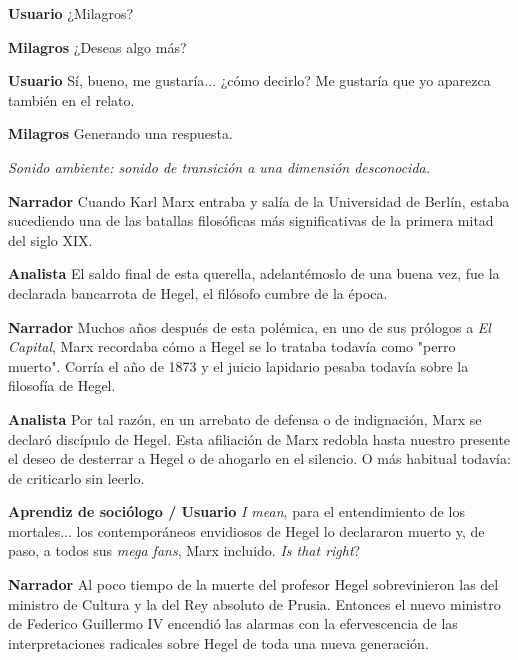 \documentclass[
  spanish,
  11pt,
  a4paper,
]{scrbook}
\newenvironment{transcripcion}{
    \begin{list}{}{
        \setlength{\leftmargin}{1.5em}  %
        \setlength{\rightmargin}{0em}
        \setlength{\itemsep}{0.2em}     %
        \setlength{\parsep}{0.0em}
        \setlength{\listparindent}{0pt}
    }
}{
    \end{list}
}
\newcommand{\personaje}[1]{\textbf{#1}\quad}
\newcommand{\escena}[1]{\textit{\small #1}\par\vspace{0.4em}}
\begin{document}
\begin{transcripcion}
\item \personaje{Usuario} ¿Milagros?

\item \personaje{Milagros} ¿Deseas algo más?

\item \personaje{Usuario} Sí, bueno, me gustaría... ¿cómo decirlo? Me gustaría que yo aparezca también en el relato.

\item \personaje{Milagros} Generando una respuesta.

\item \escena{Sonido ambiente: sonido de transición a una dimensión desconocida.}

\item \personaje{Narrador} Cuando Karl Marx entraba y salía de la Universidad de Berlín, estaba sucediendo una de las batallas filosóficas más significativas de la primera mitad del siglo XIX.

\item \personaje{Analista} El saldo final de esta querella, adelantémoslo de una buena vez, fue la declarada bancarrota de Hegel, el filósofo cumbre de la época.

\item \personaje{Narrador} Muchos años después de esta polémica, en uno de sus prólogos a \textit{El Capital}, Marx recordaba cómo a Hegel se lo trataba todavía como "perro muerto". Corría el año de 1873 y el juicio lapidario pesaba todavía sobre la filosofía de Hegel.

\item \personaje{Analista} Por tal razón, en un arrebato de defensa o de indignación, Marx se declaró discípulo de Hegel. Esta afiliación de Marx redobla hasta nuestro presente el deseo de desterrar a Hegel o de ahogarlo en el silencio. O más habitual todavía: de criticarlo sin leerlo.

\item \personaje{Aprendiz de sociólogo / Usuario} \textit{I mean}, para el entendimiento de los mortales... los contemporáneos envidiosos de Hegel lo declararon muerto y, de paso, a todos sus \textit{mega fans}, Marx incluido. \textit{Is that right}?

\item \personaje{Narrador} Al poco tiempo de la muerte del profesor Hegel sobrevinieron las del ministro de Cultura y la del Rey absoluto de Prusia. Entonces el nuevo ministro de Federico Guillermo IV encendió las alarmas con la efervescencia de las interpretaciones radicales sobre Hegel de toda una nueva generación.


\end{transcripcion}
\end{document}
